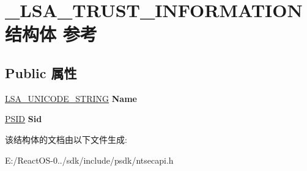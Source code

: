 \hypertarget{struct___l_s_a___t_r_u_s_t___i_n_f_o_r_m_a_t_i_o_n}{}\section{\+\_\+\+L\+S\+A\+\_\+\+T\+R\+U\+S\+T\+\_\+\+I\+N\+F\+O\+R\+M\+A\+T\+I\+O\+N结构体 参考}
\label{struct___l_s_a___t_r_u_s_t___i_n_f_o_r_m_a_t_i_o_n}
\subsection*{Public 属性}
\begin{DoxyCompactItemize}
\item 
\mbox{\label{struct___l_s_a___t_r_u_s_t___i_n_f_o_r_m_a_t_i_o_n_aa1d4be6f016627f650d027a4f1bb8226}} 
\hyperlink{struct___l_s_a___u_n_i_c_o_d_e___s_t_r_i_n_g}{L\+S\+A\+\_\+\+U\+N\+I\+C\+O\+D\+E\+\_\+\+S\+T\+R\+I\+NG} {\bfseries Name}
\item 
\mbox{\label{struct___l_s_a___t_r_u_s_t___i_n_f_o_r_m_a_t_i_o_n_a0612eb5612b0a98014e22ba5db11ec5c}} 
\hyperlink{struct___s_i_d}{P\+S\+ID} {\bfseries Sid}
\end{DoxyCompactItemize}


该结构体的文档由以下文件生成\+:\begin{DoxyCompactItemize}
\item 
E\+:/\+React\+O\+S-\/0../sdk/include/psdk/ntsecapi.\+h\end{DoxyCompactItemize}
